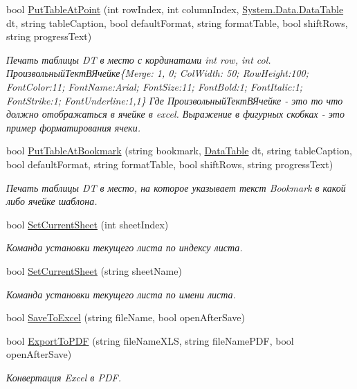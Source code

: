 \begin{DoxyCompactItemize}
bool \mbox{\hyperlink{class_f_b_a_1_1_sys_report_x_l_s_x_a334af236df896024b67b675c80d2af08}{Put\+Table\+At\+Point}} (int row\+Index, int column\+Index, \mbox{\hyperlink{_sys_static_8cs_a6542cfcff2f8e81f06ade15aa0bfe2b7}{System.\+Data.\+Data\+Table}} dt, string table\+Caption, bool default\+Format, string format\+Table, bool shift\+Rows, string progress\+Text)
\begin{DoxyCompactList}\small\item\em Печать таблицы DT в место с кординатами int row, int col. ~\newline
ПроизвольныйТектВЯчейке\{Merge\+: 1, 0; Col\+Width\+: 50; Row\+Height\+:100; Font\+Color\+:11; Font\+Name\+:Arial; Font\+Size\+:11; Font\+Bold\+:1; Font\+Italic\+:1; Font\+Strike\+:1; Font\+Underline\+:1,1\} Где ПроизвольныйТектВЯчейке -\/ это то что должно отображаться в ячейке в excel. Выражение в фигурных скобках -\/ это пример форматирования ячеки. ~\newline
\end{DoxyCompactList}\item 
bool \mbox{\hyperlink{class_f_b_a_1_1_sys_report_x_l_s_x_a51924686ef2b62af033026456d523b3e}{Put\+Table\+At\+Bookmark}} (string bookmark, \mbox{\hyperlink{_sys_data_8cs_a6542cfcff2f8e81f06ade15aa0bfe2b7}{Data\+Table}} dt, string table\+Caption, bool default\+Format, string format\+Table, bool shift\+Rows, string progress\+Text)
\begin{DoxyCompactList}\small\item\em Печать таблицы DT в место, на которое указывает текст Bookmark в какой либо ячейке шаблона. ~\newline
\end{DoxyCompactList}\item 
bool \mbox{\hyperlink{class_f_b_a_1_1_sys_report_x_l_s_x_a20aca99b8556341421ac65f7393a87fd}{Set\+Current\+Sheet}} (int sheet\+Index)
\begin{DoxyCompactList}\small\item\em Команда установки текущего листа по индексу листа. \end{DoxyCompactList}\item 
bool \mbox{\hyperlink{class_f_b_a_1_1_sys_report_x_l_s_x_a9fd512550b6846ba0ed7556745ed2523}{Set\+Current\+Sheet}} (string sheet\+Name)
\begin{DoxyCompactList}\small\item\em Команда установки текущего листа по имени листа. \end{DoxyCompactList}\item 
bool \mbox{\hyperlink{class_f_b_a_1_1_sys_report_x_l_s_x_a37deb2e7bd2a76cedf96e996f622bf03}{Save\+To\+Excel}} (string file\+Name, bool open\+After\+Save)
\item 
bool \mbox{\hyperlink{class_f_b_a_1_1_sys_report_x_l_s_x_a4a7ca28ca3144321f2f44d14b1366403}{Export\+To\+P\+DF}} (string file\+Name\+X\+LS, string file\+Name\+P\+DF, bool open\+After\+Save)
\begin{DoxyCompactList}\small\item\em Конвертация Excel в P\+DF. \end{DoxyCompactList}\end{DoxyCompactItemize}

